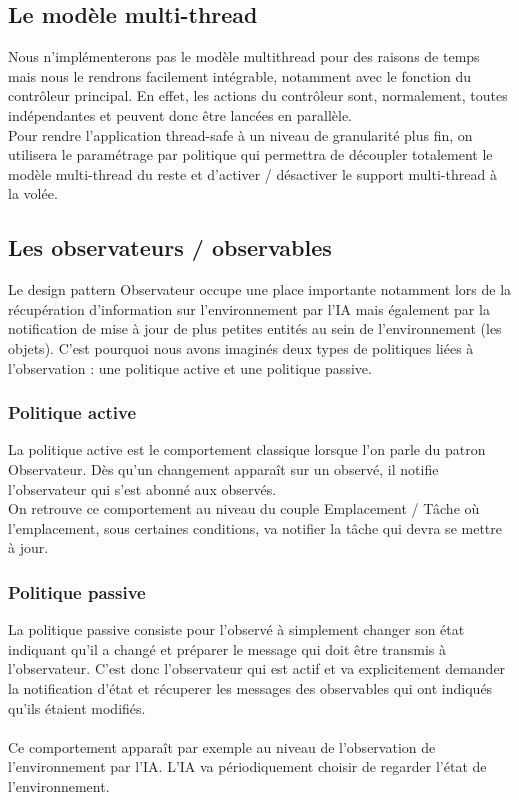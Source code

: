 \subsection*{Le modèle multi-thread}
Nous n'implémenterons pas le modèle multithread pour des raisons de temps mais nous le rendrons facilement intégrable, notamment avec le fonction du contrôleur principal. En effet, les actions du contrôleur sont, normalement, toutes indépendantes et peuvent donc être lancées en parallèle.\\

Pour rendre l'application thread-safe à un niveau de granularité plus fin, on utilisera le paramétrage par politique qui permettra de découpler totalement le modèle multi-thread du reste et d'activer / désactiver le support multi-thread à la volée.

\subsection*{Les observateurs / observables}
Le design pattern Observateur occupe une place importante notamment lors de la récupération d'information sur l'environnement par l'IA mais également par la notification de mise à jour de plus petites entités au sein de l'environnement (les objets). C'est pourquoi nous avons imaginés deux types de politiques liées à l'observation : une politique active et une politique passive.

\subsubsection{Politique active}

La politique active est le comportement classique lorsque l'on parle du patron Observateur. Dès qu'un changement apparaît sur un observé, il notifie l'observateur qui s'est abonné aux observés.\\
On retrouve ce comportement au niveau du couple Emplacement / Tâche où l'emplacement, sous certaines conditions, va notifier la tâche qui devra se mettre à jour.

\subsubsection{Politique passive}

La politique passive consiste pour l'observé à simplement changer son état indiquant qu'il a changé et préparer le message qui doit être transmis à l'observateur. C'est donc l'observateur qui est actif et va explicitement demander la notification d'état et récuperer les messages des observables qui ont indiqués qu'ils étaient modifiés.\\\\
Ce comportement apparaît par exemple au niveau de l'observation de l'environnement par l'IA. L'IA va périodiquement choisir de regarder l'état de l'environnement.

